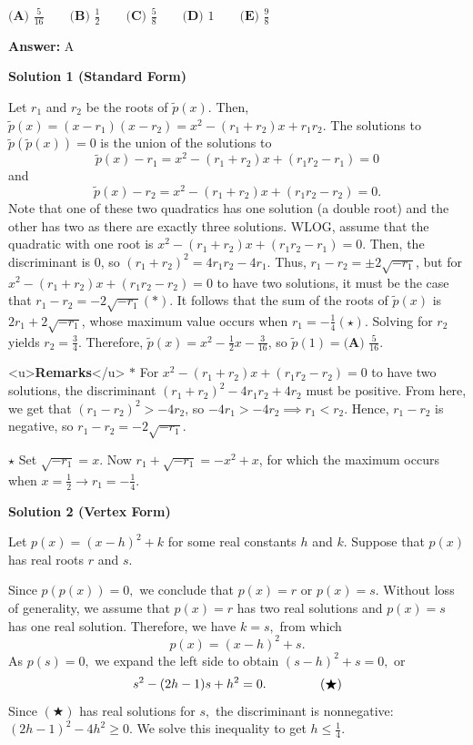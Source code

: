 \begin{enumerate}
 $\textbf{(A) } \frac{5}{16} \qquad\textbf{(B) } \frac{1}{2} \qquad\textbf{(C) } \frac{5}{8} \qquad\textbf{(D) } 1 \qquad\textbf{(E) } \frac{9}{8}$

 \textbf{Answer: }A



\textbf{Solution 1 (Standard Form)}

Let $r_1$ and $r_2$ be the roots of $\tilde{p}(x)$. Then, $\tilde{p}(x)=(x-r_1)(x-r_2)=x^2-(r_1+r_2)x+r_1r_2$. The solutions to $\tilde{p}(\tilde{p}(x))=0$ is the union of the solutions to 
 \[\tilde{p}(x)-r_1=x^2-(r_1+r_2)x+(r_1r_2-r_1)=0\] and 
 \[\tilde{p}(x)-r_2=x^2-(r_1+r_2)x+(r_1r_2-r_2)=0.\] Note that one of these two quadratics has one solution (a double root) and the other has two as there are exactly three solutions. WLOG, assume that the quadratic with one root is $x^2-(r_1+r_2)x+(r_1r_2-r_1)=0$. Then, the discriminant is $0$, so $(r_1+r_2)^2 = 4r_1r_2 - 4r_1$. Thus, $r_1-r_2=\pm 2\sqrt{-r_1}$, but for $x^2-(r_1+r_2)x+(r_1r_2-r_2)=0$ to have two solutions, it must be the case that $r_1-r_2=- 2\sqrt{-r_1} (*)$. It follows that the sum of the roots of $\tilde{p}(x)$ is $2r_1 + 2\sqrt{-r_1}$, whose maximum value occurs when $r_1 = - \frac{1}{4} (\star)$. Solving for $r_2$ yields $r_2 = \frac{3}{4}$. Therefore, $\tilde{p}(x)=x^2 - \frac{1}{2} x - \frac{3}{16}$, so $\tilde{p}(1)= \boxed{\textbf{(A) } \frac{5}{16}}$.

 <u>\textbf{Remarks}</u>
$*$ For $x^2-(r_1+r_2)x+(r_1r_2-r_2)=0$ to have two solutions, the discriminant $(r_1+r_2)^2-4r_1r_2+4r_2$ must be positive. From here, we get that $(r_1-r_2)^2>-4r_2$, so $-4r_1>-4r_2 \implies r_1<r_2$. Hence, $r_1-r_2$ is negative, so $r_1-r_2=-2\sqrt{-r_1}$.

 $\star$ Set $\sqrt{-r_1}=x$. Now $r_1+\sqrt{-r_1}=-x^2+x$, for which the maximum occurs when $x=\frac{1}{2} \rightarrow r_1=-\frac{1}{4}$.

 



\textbf{Solution 2 (Vertex Form)}

Let $p(x)=(x-h)^2+k$ for some real constants $h$ and $k.$ Suppose that $p(x)$ has real roots $r$ and $s.$

 Since $p(p(x))=0,$ we conclude that $p(x)=r$ or $p(x)=s.$ Without loss of generality, we assume that $p(x)=r$ has two real solutions and $p(x)=s$ has one real solution. Therefore, we have $k=s,$ from which 
 \[p(x)=(x-h)^2+s.\]As $p(s)=0,$ we expand the left side to obtain $(s-h)^2+s=0,$ or 
 \[s^2-(2h-1)s+h^2=0. \hspace{15mm}(\bigstar)\]Since $(\bigstar)$ has real solutions for $s,$ the discriminant is nonnegative: $(2h-1)^2-4h^2\geq0.$ We solve this inequality to get $h\leq \frac14.$


\end{enumerate}
